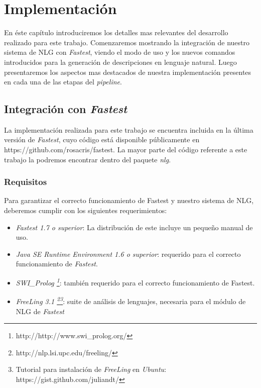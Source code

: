 \chapter{Implementación}
\label{cap:implementacion}

En éste capítulo introduciremos los detalles mas relevantes del desarrollo realizado para este trabajo. Comenzaremos mostrando la integración de nuestro sistema de NLG con \textit{Fastest}, viendo el modo de uso y los nuevos comandos introducidos para la generación de descripciones en lenguaje natural. Luego presentaremos los aspectos mas destacados de nuestra implementación presentes en cada una de las etapas del \emph{pipeline}.

\section{Integración con \emph{Fastest}}

La implementación realizada para este trabajo se encuentra incluida en la última versión de \emph{Fastest}, cuyo código está disponible públicamente en https://github.com/rosacris/fastest. La mayor parte del código referente a este trabajo la podremos encontrar dentro del paquete \textit{nlg}.

\subsection*{Requisitos}

Para garantizar el correcto funcionamiento de Fastest y nuestro sistema de NLG, deberemos cumplir con los siguientes requerimientos:

\begin{itemize}
 \item  \emph{Fastest 1.7 o superior}: La distribución de este incluye un pequeño manual de uso.
 \item  \emph{Java SE Runtime Environment 1.6 o superior}: requerido para el correcto funcionamiento de \emph{Fastest}.
 \item  \emph{SWI\_Prolog \footnote{http://http://www.swi\_prolog.org/}}: también requerido para el correcto funcionamiento de Fastest.
 \item  \emph{FreeLing 3.1 \footnote{http://nlp.lsi.upc.edu/freeling/}\footnote{Tutorial para instalación de \emph{FreeLing} en \emph{Ubuntu}: https://gist.github.com/juliandt/}}: suite de análisis de lenguajes, necesaria para el módulo de NLG de \emph{Fastest}
\end{itemize}

